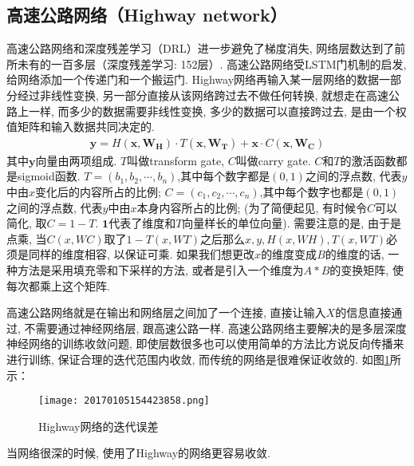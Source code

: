 \subsection{高速公路网络（Highway network）}
高速公路网络和深度残差学习（DRL）进一步避免了梯度消失, 网络层数达到了前所未有的一百多层（深度残差学习: 152层）\cite{HeCVPR2016-9590, NIPS2015-5850}.
高速公路网络受LSTM门机制的启发, 给网络添加一个传递门和一个搬运门. Highway网络再输入某一层网络的数据一部分经过非线性变换, 另一部分直接从该网络跨过去不做任何转换, 就想走在高速公路上一样, 而多少的数据需要非线性变换, 多少的数据可以直接跨过去, 是由一个权值矩阵和输入数据共同决定的.
\begin{align}
    \mathbf{y}=H\left(\mathbf{x}, \mathbf{W}_{\mathbf{H}}\right) \cdot T\left(\mathbf{x}, \mathbf{W}_{\mathbf{T}}\right)+\mathbf{x} \cdot C\left(\mathbf{x}, \mathbf{W}_{\mathbf{C}}\right)
\end{align}
其中$\bm y$向量由两项组成. $T$叫做transform gate, $C$叫做carry gate. $C$和$T$的激活函数都是sigmoid函数.
$T=(b_1, b_2, \cdots, b_n)$,其中每个数字都是$(0, 1)$之间的浮点数, 代表$y$中由$x$变化后的内容所占的比例;
$C=(c_1, c_2, \cdots, c_n)$,其中每个数字也都是$(0, 1)$之间的浮点数, 代表$y$中由$x$本身内容所占的比例;
(为了简便起见, 有时候令$C$可以简化, 取$C=1-T$. $\bm 1$代表了维度和$T$向量样长的单位向量).
需要注意的是, 由于是点乘, 当$C(x,WC)$取了$1-T(x,WT)$之后那么$x,y,H(x,WH),T(x,WT)$必须是同样的维度相容, 以保证可乘.
如果我们想更改$x$的维度变成$B$的维度的话, 一种方法是采用填充零和下采样的方法, 或者是引入一个维度为$A*B$的变换矩阵, 使每次都乘上这个矩阵.

高速公路网络就是在输出和网络层之间加了一个连接, 直接让输入$X$的信息直接通过, 不需要通过神经网络层, 跟高速公路一样.
高速公路网络主要解决的是多层深度神经网络的训练收敛问题, 即使层数很多也可以使用简单的方法比方说反向传播来进行训练, 保证合理的迭代范围内收敛, 而传统的网络是很难保证收敛的. 如图\ref{20170105154423858}所示：
\begin{figure}[H]
    \centering
    \texttt{[image: 20170105154423858.png]}
    \caption{Highway网络的迭代误差}
    \label{20170105154423858}
    \vspace{-0.4cm}
\end{figure}
当网络很深的时候, 使用了Highway的网络更容易收敛.

